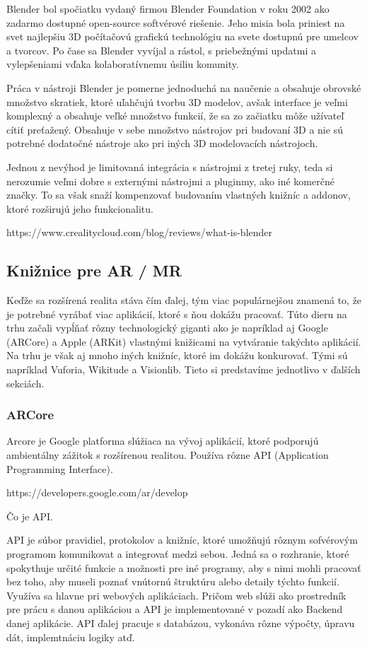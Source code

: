 Blender bol spočiatku vydaný firmou Blender Foundation v roku 2002 ako zadarmo dostupné open-source softvérové riešenie. Jeho misia bola priniest na svet najlepšiu 3D počítačovú grafickú technológiu na svete dostupnú pre umelcov a tvorcov. Po čase sa Blender vyvíjal a rástol, s priebežnými updatmi a vylepšeniami vďaka kolaboratívnemu úsiliu komunity. 

Práca v nástroji Blender je pomerne jednoduchá na naučenie a obsahuje obrovské množstvo skratiek, ktoré uľahčujú tvorbu 3D modelov, avšak interface je veľmi komplexný a obsahuje veľké množstvo funkcií, že sa zo začiatku môže užívateľ cítiť preťažený. Obsahuje v sebe množstvo nástrojov pri budovaní 3D a nie sú potrebné dodatočné nástroje ako pri iných 3D modelovacích nástrojoch. 

Jednou z nevýhod je limitovaná integrácia s nástrojmi z tretej ruky, teda si nerozumie veľmi dobre s externými nástrojmi a pluginmy, ako iné komerčné značky. To sa však snaží kompenzovať budovaním vlastných knižníc a addonov, ktoré rozširujú jeho funkcionalitu.

https://www.crealitycloud.com/blog/reviews/what-is-blender

\subsection{Knižnice pre AR / MR}
Keďže sa rozšírená realita stáva čím ďalej, tým viac populárnejšou znamená to, že je potrebné vyrábať viac aplikácií, ktoré s ňou dokážu pracovať. Túto dieru na trhu začali vypĺňať rôzny technologický giganti ako je napríklad aj Google (ARCore) a Apple (ARKit) vlastnými knižicami na vytváranie takýchto aplikácií. Na trhu je však aj mnoho iných knižníc, ktoré im dokážu konkurovať. Tými sú napríklad Vuforia, Wikitude a Visionlib. Tieto si predstavíme jednotlivo v ďalších sekciách.

\subsubsection{ARCore}

Arcore je Google platforma slúžiaca na vývoj aplikácií, ktoré podporujú ambientálny zážitok s rozšírenou realitou. Používa rôzne API (Application Programming Interface). 

https://developers.google.com/ar/develop

Čo je API.

API je súbor pravidiel, protokolov a knižníc, ktoré umožňujú rôznym sofvérovým programom komunikovat a integrovať medzi sebou. Jedná sa o rozhranie, ktoré spokythuje určité funkcie a možnosti pre iné programy, aby s nimi mohli pracovať bez toho, aby museli poznať vnútornú štruktúru alebo detaily týchto funkcií. Využíva sa hlavne pri webových aplikáciach. Pričom web slúži ako prostredník pre prácu s danou aplikáciou a API je implementované v pozadí ako Backend danej aplikácie. API ďalej pracuje s databázou, vykonáva rôzne výpočty, úpravu dát, implemtnáciu logiky atď.

